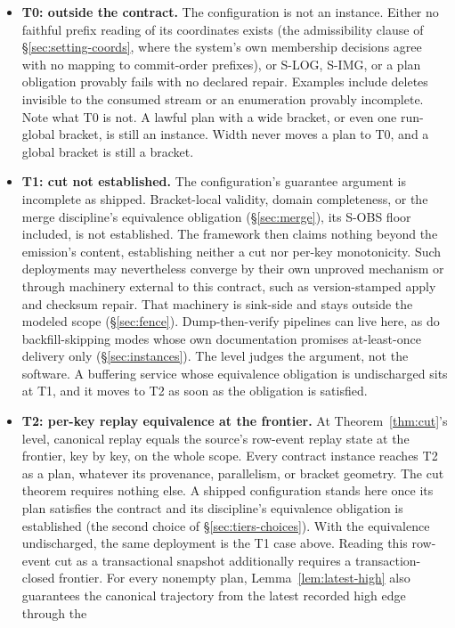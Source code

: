 \documentclass[sigconf,nonacm,10pt]{acmart}
\theoremstyle{plain}
\theoremstyle{definition}
\begin{document}
\begin{itemize}
\item \textbf{T0: outside the contract.} The configuration is not an
instance. Either no faithful prefix reading of its
coordinates exists (the admissibility clause of
\S\ref{sec:setting-coords}, where the system's own membership decisions
agree with no mapping to commit-order prefixes), or S-LOG, S-IMG, or a plan
obligation provably fails with no declared repair. Examples include deletes invisible
to the consumed stream or an enumeration provably incomplete. Note
what T0 is not. A lawful plan with a wide bracket, or even one
run-global bracket, is still an instance. Width never moves a plan to T0, and a global bracket is still a bracket.
\item \textbf{T1: cut not established.} The configuration's
guarantee argument is incomplete as shipped. Bracket-local
validity, domain completeness, or the merge discipline's equivalence
obligation (\S\ref{sec:merge}), its S-OBS floor included, is not
established. The framework
then claims nothing beyond the emission's content, establishing neither a cut nor
per-key monotonicity. Such deployments may nevertheless converge by
their own unproved mechanism or through machinery external to this
contract, such as version-stamped apply and checksum repair. That
machinery is sink-side and stays outside the modeled scope
(\S\ref{sec:fence}). Dump-then-verify pipelines can live here, as do
backfill-skipping modes whose own documentation promises
at-least-once delivery only (\S\ref{sec:instances}). The level judges
the argument, not the software. A buffering service whose equivalence
obligation is undischarged sits at T1, and it moves to T2 as soon as
the obligation is satisfied.
\item \textbf{T2: per-key replay equivalence at the frontier.}
At Theorem~\ref{thm:cut}'s level, canonical replay equals the source's
row-event replay state at the frontier, key by key, on the whole
scope. Every contract
instance reaches T2 as a plan, whatever its provenance,
parallelism, or
bracket geometry. The cut theorem requires nothing else. A
shipped configuration stands here once its plan satisfies the
contract and its discipline's equivalence obligation is
established (the second choice of \S\ref{sec:tiers-choices}). With
the equivalence undischarged, the same deployment is the T1 case
above. Reading this row-event cut as a transactional snapshot
additionally requires a transaction-closed frontier. For every
nonempty plan, Lemma~\ref{lem:latest-high} also guarantees the
canonical trajectory from the latest recorded high edge through the

\end{itemize}
\end{document}
